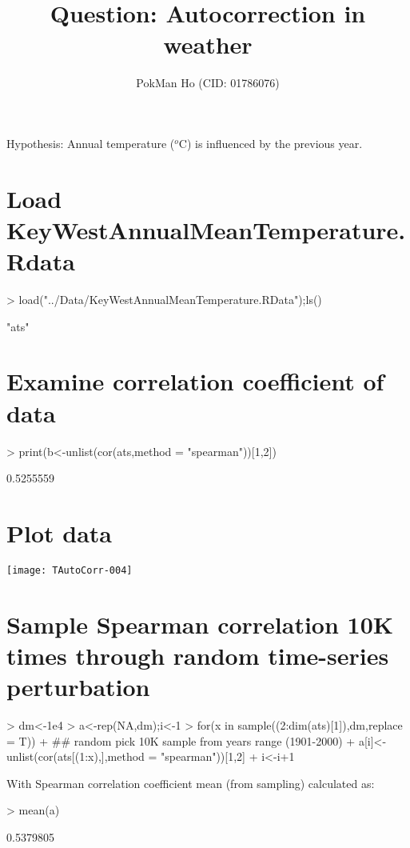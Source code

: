\documentclass{article}
\title{Question: Autocorrection in weather}
\author{PokMan Ho (CID: 01786076)}
\date{}
\begin{document}


\maketitle
\begin{center}
  Hypothesis: Annual temperature ($^o$C) is influenced by the previous year.
\end{center}
\section{Load \textbf{KeyWestAnnualMeanTemperature.Rdata}}
\begin{Schunk}
\begin{Sinput}
> load("../Data/KeyWestAnnualMeanTemperature.RData");ls()
\end{Sinput}
\begin{Soutput}
[1] "ats"
\end{Soutput}
\end{Schunk}

\section{Examine correlation coefficient of data\label{osp}}
\begin{Schunk}
\begin{Sinput}
> print(b<-unlist(cor(ats,method = "spearman"))[1,2])
\end{Sinput}
\begin{Soutput}
[1] 0.5255559
\end{Soutput}
\end{Schunk}

\section{Plot data\label{plot}}
\texttt{[image: TAutoCorr-004]}

\section{Sample Spearman correlation 10K times through random time-series perturbation\label{ssp}}
\begin{Schunk}
\begin{Sinput}
> dm<-1e4
> a<-rep(NA,dm);i<-1
> for(x in sample((2:dim(ats)[1]),dm,replace = T)){
+   ## random pick 10K sample from years range (1901-2000)
+   a[i]<-unlist(cor(ats[(1:x),],method = "spearman"))[1,2]
+   i<-i+1}
\end{Sinput}
\end{Schunk}
\clearpage
With Spearman correlation coefficient mean (from sampling) calculated as:
\begin{Schunk}
\begin{Sinput}
> mean(a)
\end{Sinput}
\begin{Soutput}
[1] 0.5379805
\end{Soutput}
\end{Schunk}
\end{document}
